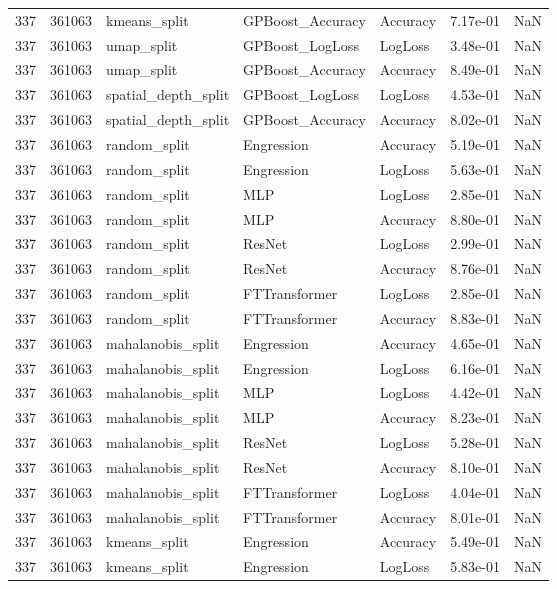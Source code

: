 \begin{tabular}{rrlllrr}
337 & 361063 & kmeans\_split & GPBoost\_Accuracy & Accuracy & 7.17e-01 & NaN \\
337 & 361063 & umap\_split & GPBoost\_LogLoss & LogLoss & 3.48e-01 & NaN \\
337 & 361063 & umap\_split & GPBoost\_Accuracy & Accuracy & 8.49e-01 & NaN \\
337 & 361063 & spatial\_depth\_split & GPBoost\_LogLoss & LogLoss & 4.53e-01 & NaN \\
337 & 361063 & spatial\_depth\_split & GPBoost\_Accuracy & Accuracy & 8.02e-01 & NaN \\
337 & 361063 & random\_split & Engression & Accuracy & 5.19e-01 & NaN \\
337 & 361063 & random\_split & Engression & LogLoss & 5.63e-01 & NaN \\
337 & 361063 & random\_split & MLP & LogLoss & 2.85e-01 & NaN \\
337 & 361063 & random\_split & MLP & Accuracy & 8.80e-01 & NaN \\
337 & 361063 & random\_split & ResNet & LogLoss & 2.99e-01 & NaN \\
337 & 361063 & random\_split & ResNet & Accuracy & 8.76e-01 & NaN \\
337 & 361063 & random\_split & FTTransformer & LogLoss & 2.85e-01 & NaN \\
337 & 361063 & random\_split & FTTransformer & Accuracy & 8.83e-01 & NaN \\
337 & 361063 & mahalanobis\_split & Engression & Accuracy & 4.65e-01 & NaN \\
337 & 361063 & mahalanobis\_split & Engression & LogLoss & 6.16e-01 & NaN \\
337 & 361063 & mahalanobis\_split & MLP & LogLoss & 4.42e-01 & NaN \\
337 & 361063 & mahalanobis\_split & MLP & Accuracy & 8.23e-01 & NaN \\
337 & 361063 & mahalanobis\_split & ResNet & LogLoss & 5.28e-01 & NaN \\
337 & 361063 & mahalanobis\_split & ResNet & Accuracy & 8.10e-01 & NaN \\
337 & 361063 & mahalanobis\_split & FTTransformer & LogLoss & 4.04e-01 & NaN \\
337 & 361063 & mahalanobis\_split & FTTransformer & Accuracy & 8.01e-01 & NaN \\
337 & 361063 & kmeans\_split & Engression & Accuracy & 5.49e-01 & NaN \\
337 & 361063 & kmeans\_split & Engression & LogLoss & 5.83e-01 & NaN \\

\end{tabular}
